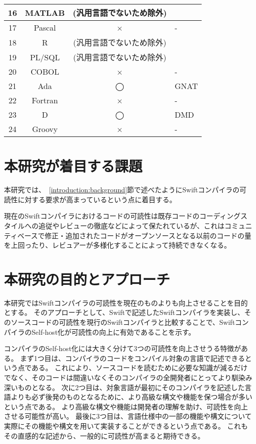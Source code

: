 \begin{table}[hb]
\begin{center}
\begin{tabular}{|c|c|c|m{4.5cm}|}
            \hline
            16 & MATLAB & (汎用言語でないため除外) & \\
            \hline
            17 & Pascal & × & - \\
            \hline
            18 & R & (汎用言語でないため除外) & \\
            \hline
            19 & PL/SQL & (汎用言語でないため除外) & \\
            \hline
            20 & COBOL & × & - \\
            \hline
            21 & Ada & ◯ & GNAT \\
            \hline
            22 & Fortran & × & - \\
            \hline
            23 & D & ◯ & DMD \\
            \hline
            24 & Groovy & × & - \\
            \hline
        \end{tabular}
        \label{table:bootstrapping-languages}
    \end{center}
\end{table}


\section{本研究が着目する課題}
\label{introduction:issue}

本研究では、~\ref{introduction:background}節で述べたようにSwiftコンパイラの可読性に対する要求が高まっているという点に着目する。

現在のSwiftコンパイラにおけるコードの可読性は既存コードのコーディングスタイルへの追従やレビューの徹底などによって保たれているが、これはコミュニティベースで修正・追加されたコードがオープンソースとなる以前のコードの量を上回ったり、レビュアーが多様化することによって持続できなくなる。


\section{本研究の目的とアプローチ}
\label{introduction:purpose}

本研究ではSwiftコンパイラの可読性を現在のものよりも向上させることを目的とする。
そのアプローチとして、Swiftで記述したSwiftコンパイラを実装し、そのソースコードの可読性を現行のSwiftコンパイラと比較することで、SwiftコンパイラのSelf-host化が可読性の向上に有効であることを示す。

コンパイラのSelf-host化には大きく分けて3つの可読性を向上させうる特徴がある。
まず1つ目は、コンパイラのコードをコンパイル対象の言語で記述できるという点である。
これにより、ソースコードを読むために必要な知識が減るだけでなく、そのコードは間違いなくそのコンパイラの全開発者にとってより馴染み深いものとなる。
次に2つ目は、対象言語が最初にそのコンパイラを記述した言語よりも必ず後発のものとなるために、より高級な構文や機能を保つ場合が多いという点である。
より高級な構文や機能は開発者の理解を助け、可読性を向上させる可能性が高い。
最後に3つ目は、言語仕様中の一部の機能や構文について実際にその機能や構文を用いて実装することができるという点である。
これもその直感的な記述から、一般的に可読性が高まると期待できる。


